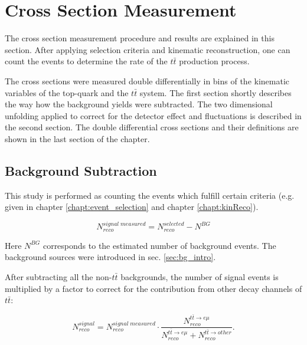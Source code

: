 \chapter{Cross Section Measurement}\label{chapt:xsec}

The cross section measurement procedure and results are explained in this section.
After applying selection criteria and kinematic reconstruction, one can count the events to determine
the rate of the $t\bar{t}$ production process.

The cross sections were measured double differentially in bins of the kinematic variables of the top-quark and the $t\bar{t}$ system.
The first section shortly describes the way how the background yields were subtracted.
The two dimensional unfolding applied to correct for the detector effect and fluctuations is described
in the second section.
The double differential cross sections and their definitions are shown in the last section of the chapter.

\section{Background Subtraction}
This study is performed as counting the events which fulfill certain criteria (e.g. given in chapter \ref{chapt:event_selection} and 
chapter \ref{chapt:kinReco}). 

\begin{equation}\label{eq:bgsub}
 N^{signal\;measured}_{reco} = N^{selected}_{reco} - N^{BG}
\end{equation}

Here $N^{BG}$ corresponds to the estimated number of background events. The background sources were introduced in sec. \ref{sec:bg_intro}.

After subtracting all the non-$t\bar{t}$ backgrounds, the number of signal events is multiplied by a factor to correct for the contribution
from other decay channels of $t\bar{t}$:

\begin{equation}\label{eq:bgsub}
 N^{signal}_{reco} = N^{signal\;measured}_{reco} \cdot \frac{N^{t\bar{t} \rightarrow e\mu}_{reco}}{N^{t\bar{t} \rightarrow e\mu}_{reco} + N^{t\bar{t} \rightarrow other}_{reco}}.
\end{equation}

